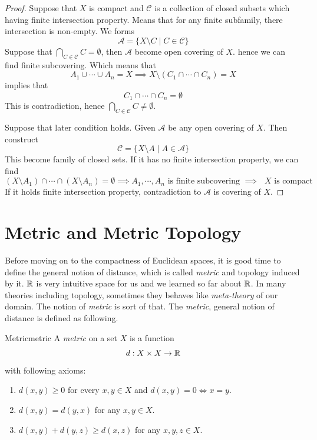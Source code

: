 \documentclass[12pt, a4paper, twoside]{article}
\newcommand{\CA}{{\mathcal {A}}} \newcommand{\CB}{{\mathcal {B}}}
\newcommand{\CC}{{\mathcal {C}}} \newcommand{\CD}{{\mathcal {D}}}
\theoremstyle{plain}
\begin{document}
\begin{proof}
    Suppose that $X$ is compact and $\CC$ is a collection of closed subsets which having finite intersection property. 
    Means that for any finite subfamily, there intersection is non-empty. 
    We forms 
    \[\CA = \{X \setminus C \mid C \in \CC\}\]
    Suppose that $\bigcap_{C \in \CC} C = \emptyset$, then $\CA$ become open covering of $X$. hence we can find finite subcovering. 
    Which means that 
    \[A_1 \cup \cdots \cup A_n = X \implies X \setminus (C_1 \cap \cdots \cap C_n) = X\]
    implies that 
    \[C_1 \cap \cdots \cap C_n = \emptyset\]
    This is contradiction, hence $\bigcap_{C \in \CC} C \neq \emptyset$. 

    Suppose that later condition holds. 
    Given $\CA$ be any open covering of $X$. 
    Then construct 
    \[\CC = \{X \setminus A \mid A \in \CA\}\]
    This become family of closed sets. If it has no finite intersection property, we can find 
    \[(X \setminus A_1) \cap \cdots \cap (X \setminus A_n) = \emptyset \implies A_1, \cdots, A_n \text{ is finite subcovering $\implies$ $X$ is compact}\]
    If it holds finite intersection property, contradiction to $\CA$ is covering of $X$.
\end{proof}

\newpage 

\section{Metric and Metric Topology}

Before moving on to the compactness of Euclidean spaces, it is good time to define the 
general notion of distance, which is called \textit{metric} and topology induced by it. 
${\mathbb {R}}$ is very intuitive space for us and we learned so far about ${\mathbb {R}}$. 
In many theories including topology, sometimes they behaves like \textit{meta-theory} of our domain. 
The notion of \textit{metric} is sort of that. 
The \textit{metric}, general notion of distance is defined as following. 

\begin{defn}{Metric}{metric}
    A \textit{metric} on a set $X$ is a function 
    \[d: X \times X \rightarrow {\mathbb {R}}\]
    with following axioms: 
    \begin{enumerate}
        \item $d(x, y) \geq 0$ for every $x, y \in X$ and $d(x, y) = 0 \iff x = y$. 
        \item $d(x, y) = d(y, x)$ for any $x, y \in X$. 
        \item $d(x, y) + d(y, z) \geq d(x, z)$ for any $x, y, z \in X$.
    \end{enumerate}
\end{defn}
\end{document}
